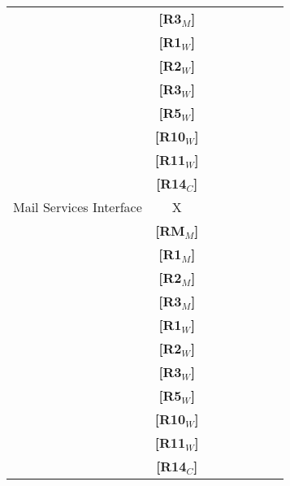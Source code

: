 \begin{tabular}{l*{6}{c}r}
                        & \textbf{[R3$_M$]}\\
                        & \textbf{[R1$_W$]}\\
                        & \textbf{[R2$_W$]}\\
                        & \textbf{[R3$_W$]}\\
                        & \textbf{[R5$_W$]}\\
                        & \textbf{[R10$_W$]}\\
                        & \textbf{[R11$_W$]}\\
                        & \textbf{[R14$_C$]}\\
    \hline
    Mail Services Interface & X \\
                        & \textbf{[RM$_M$]}\\
                        & \textbf{[R1$_M$]}\\
                        & \textbf{[R2$_M$]}\\
                        & \textbf{[R3$_M$]}\\
                        & \textbf{[R1$_W$]}\\
                        & \textbf{[R2$_W$]}\\
                        & \textbf{[R3$_W$]}\\
                        & \textbf{[R5$_W$]}\\
                        & \textbf{[R10$_W$]}\\
                        & \textbf{[R11$_W$]}\\
                        & \textbf{[R14$_C$]}\\
    
\end{tabular}